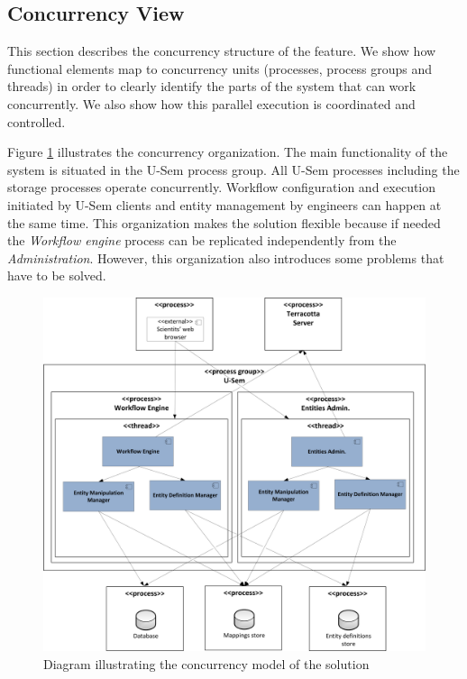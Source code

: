 \subsection{Concurrency View}

This section describes the concurrency structure of the feature. We show how functional elements map to concurrency units (processes, process groups and threads) in order to clearly identify the parts of the system that can work concurrently. We also show how this parallel execution is coordinated and controlled.

Figure \ref{fig:storageConc} illustrates the concurrency organization. The main functionality of the system is situated in the U-Sem process group. All U-Sem processes including the storage processes operate concurrently. Workflow configuration and execution initiated by U-Sem clients and entity management by engineers can happen at the same time. This organization makes the solution flexible because if needed the \textit{Workflow engine} process can be replicated independently from the \textit{Administration}. However, this organization also introduces some problems that have to be solved.

\begin{figure}[h!]
  \centering
  	\includegraphics[scale=0.6]{storage/functional/concur.png}
  \caption{Diagram illustrating the concurrency model of the solution}
  \label{fig:storageConc}
\end{figure}


